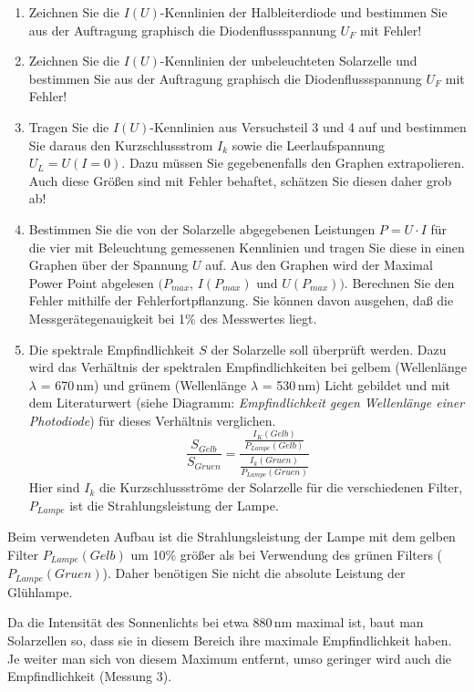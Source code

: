 \begin{enumerate}
	\item Zeichnen Sie die $I(U)$-Kennlinien der Halbleiterdiode und bestimmen Sie aus der Auftragung graphisch die Diodenflussspannung $U_F$ mit Fehler!
	\item Zeichnen Sie die $I(U)$-Kennlinien der unbeleuchteten Solarzelle und bestimmen Sie aus der Auftragung graphisch die Diodenflussspannung $U_F$ mit Fehler!
	\item Tragen Sie die $I(U)$-Kennlinien aus Versuchsteil 3 und 4 auf und bestimmen Sie daraus den Kurzschlussstrom $I_k$ sowie die Leerlaufspannung $U_L = U (I = 0)$. Dazu müssen Sie gegebenenfalls den Graphen extrapolieren. 	
		Auch diese Größen sind mit Fehler behaftet, schätzen Sie diesen daher grob ab!
	\item Bestimmen Sie die von der Solarzelle abgegebenen Leistungen $P = U \cdot I$ für die vier mit Beleuchtung gemessenen Kennlinien und tragen Sie diese in einen Graphen über der Spannung $U$ auf. Aus den Graphen wird der Maximal Power Point abgelesen $(P_{max}$, $I(P_{max})$ und $U(P_{max}))$. Berechnen Sie den Fehler mithilfe der Fehlerfortpflanzung. Sie können davon ausgehen, daß die Messgerätegenauigkeit bei 1\% des Messwertes liegt.
	\item Die spektrale Empfindlichkeit $S$ der Solarzelle soll überprüft werden. Dazu wird das Verhältnis der spektralen Empfindlichkeiten bei gelbem (Wellenlänge $\lambda$ = 670\,nm) und grünem (Wellenlänge $\lambda$ = 530\,nm)
		Licht gebildet und mit dem Literaturwert (siehe Diagramm: \textit{Empfindlichkeit gegen Wellenlänge einer Photodiode}) für dieses Verhältnis verglichen.
		\begin{equation}
			\frac{S_{Gelb}}{S_{Gruen}}=\frac{\frac{I_K(Gelb)}{P_{Lampe}(Gelb)}}{\frac{I_k(Gruen)}{P_{Lampe}(Gruen)}}
		\end{equation}
		Hier sind $I_k$ die Kurzschlussströme der Solarzelle für die verschiedenen Filter, $P_{Lampe}$ ist die Strahlungsleistung der Lampe.
\end{enumerate}
Beim verwendeten Aufbau ist die Strahlungsleistung der Lampe mit dem gelben Filter $P_{Lampe}(Gelb)$ um 10\% größer als bei Verwendung des grünen Filters ($P_{Lampe}(Gruen)$). Daher benötigen Sie nicht die absolute Leistung der Glühlampe.

\noindent
Da die Intensität des Sonnenlichts bei etwa 880\,nm maximal ist, baut man Solarzellen so, dass sie in diesem Bereich ihre maximale Empfindlichkeit haben. Je weiter man sich von diesem Maximum entfernt, umso geringer wird auch die Empfindlichkeit (Messung 3).

